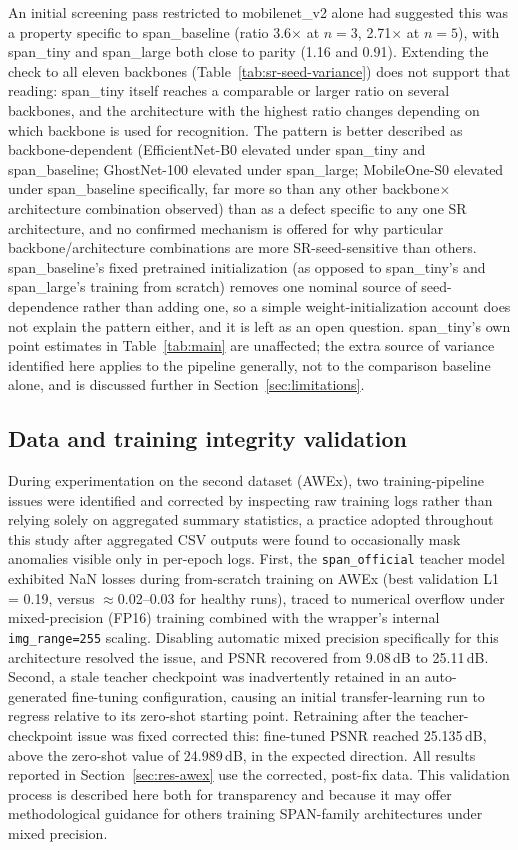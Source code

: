 \documentclass[11pt]{article}
\begin{document}
An initial screening pass restricted to mobilenet\_v2 alone had suggested this was a property specific to span\_baseline (ratio 3.6$\times$ at $n=3$, 2.71$\times$ at $n=5$), with span\_tiny and span\_large both close to parity (1.16 and 0.91). Extending the check to all eleven backbones (Table~\ref{tab:sr-seed-variance}) does not support that reading: span\_tiny itself reaches a comparable or larger ratio on several backbones, and the architecture with the highest ratio changes depending on which backbone is used for recognition. The pattern is better described as backbone-dependent (EfficientNet-B0 elevated under span\_tiny and span\_baseline; GhostNet-100 elevated under span\_large; MobileOne-S0 elevated under span\_baseline specifically, far more so than any other backbone$\times$architecture combination observed) than as a defect specific to any one SR architecture, and no confirmed mechanism is offered for why particular backbone/architecture combinations are more SR-seed-sensitive than others. span\_baseline's fixed pretrained initialization (as opposed to span\_tiny's and span\_large's training from scratch) removes one nominal source of seed-dependence rather than adding one, so a simple weight-initialization account does not explain the pattern either, and it is left as an open question. span\_tiny's own point estimates in Table~\ref{tab:main} are unaffected; the extra source of variance identified here applies to the pipeline generally, not to the comparison baseline alone, and is discussed further in Section~\ref{sec:limitations}.

\subsection{Data and training integrity validation}
\label{sec:integrity}

During experimentation on the second dataset (AWEx), two training-pipeline issues were identified and corrected by inspecting raw training logs rather than relying solely on aggregated summary statistics, a practice adopted throughout this study after aggregated CSV outputs were found to occasionally mask anomalies visible only in per-epoch logs. First, the \texttt{span\_official} teacher model exhibited NaN losses during from-scratch training on AWEx (best validation L1 = 0.19, versus $\approx$0.02--0.03 for healthy runs), traced to numerical overflow under mixed-precision (FP16) training combined with the wrapper's internal \texttt{img\_range=255} scaling. Disabling automatic mixed precision specifically for this architecture resolved the issue, and PSNR recovered from 9.08\,dB to 25.11\,dB. Second, a stale teacher checkpoint was inadvertently retained in an auto-generated fine-tuning configuration, causing an initial transfer-learning run to regress relative to its zero-shot starting point. Retraining after the teacher-checkpoint issue was fixed corrected this: fine-tuned PSNR reached 25.135\,dB, above the zero-shot value of 24.989\,dB, in the expected direction. All results reported in Section~\ref{sec:res-awex} use the corrected, post-fix data. This validation process is described here both for transparency and because it may offer methodological guidance for others training SPAN-family architectures under mixed precision.
\end{document}
